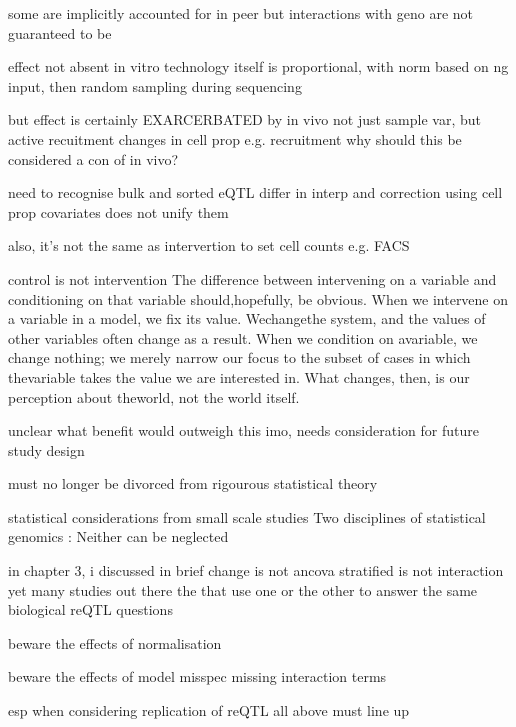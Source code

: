 \begin{outline}
    some are implicitly accounted for in peer
        but interactions with geno are not guaranteed to be

    effect not absent in vitro
        technology itself is proportional, with norm based on ng input, then random sampling during sequencing

    but effect is certainly EXARCERBATED by in vivo
        not just sample var, but active recuitment changes in cell prop e.g. recruitment
            why should this be considered a con of in vivo?

    need to recognise 
        bulk and sorted eQTL differ in interp
            and correction using cell prop covariates does not unify them

        also, it's not the same as intervertion to set cell counts e.g. FACS

            control is not intervention
                The difference between intervening on a variable and conditioning on that
                variable should,hopefully, be obvious. When we intervene on a variable in a
                model, we fix its value. Wechangethe system, and the values of other variables
                often change as a result. When we condition on avariable, we change nothing; we
                merely narrow our focus to the subset of cases in which thevariable takes the
                value we are interested in. What changes, then, is our perception about
                theworld, not the world itself.

    unclear what benefit would outweigh this
        imo, needs consideration for future study design

    must no longer be divorced from rigourous statistical theory

        statistical considerations from small scale studies
            Two disciplines of statistical genomics : Neither can be neglected

            in chapter 3, i discussed in brief
                change is not ancova
                stratified is not interaction
                yet many studies out there the that use one or the other to answer the same biological reQTL questions

        beware the effects of normalisation

        beware the effects of model misspec
            missing interaction terms

        esp when considering replication of reQTL
            all above must line up


\end{outline}
